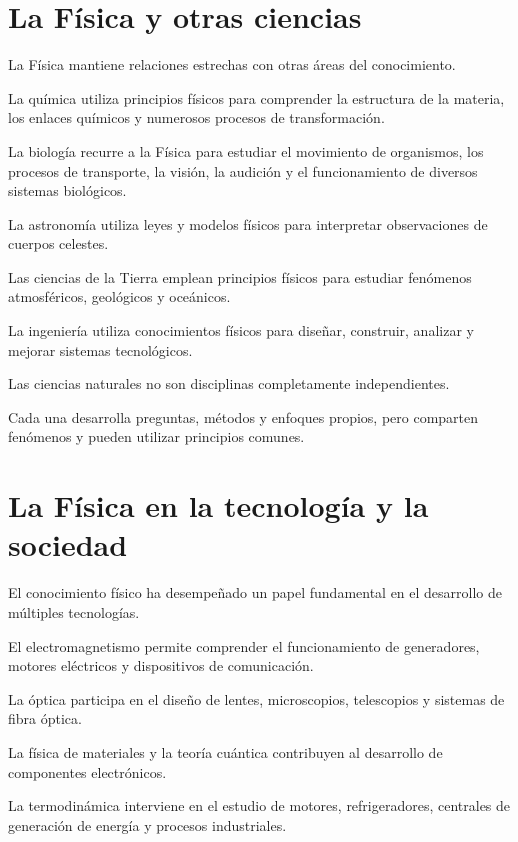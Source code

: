 \section{La Física y otras ciencias}

La Física mantiene relaciones estrechas
con otras áreas del conocimiento.

La química utiliza principios físicos
para comprender la estructura de la materia,
los enlaces químicos y numerosos
procesos de transformación.

La biología recurre a la Física
para estudiar el movimiento de organismos,
los procesos de transporte, la visión,
la audición y el funcionamiento
de diversos sistemas biológicos.

La astronomía utiliza leyes y modelos
físicos para interpretar observaciones
de cuerpos celestes.

Las ciencias de la Tierra emplean
principios físicos para estudiar
fenómenos atmosféricos, geológicos
y oceánicos.

La ingeniería utiliza conocimientos
físicos para diseñar, construir,
analizar y mejorar sistemas tecnológicos.

\begin{idea}

Las ciencias naturales no son disciplinas
completamente independientes.

Cada una desarrolla preguntas,
métodos y enfoques propios,
pero comparten fenómenos
y pueden utilizar principios comunes.

\end{idea}


\section{La Física en la tecnología y la sociedad}

El conocimiento físico ha desempeñado
un papel fundamental en el desarrollo
de múltiples tecnologías.

El electromagnetismo permite comprender
el funcionamiento de generadores,
motores eléctricos y dispositivos
de comunicación.

La óptica participa en el diseño
de lentes, microscopios, telescopios
y sistemas de fibra óptica.

La física de materiales y la teoría
cuántica contribuyen al desarrollo
de componentes electrónicos.

La termodinámica interviene en
el estudio de motores, refrigeradores,
centrales de generación de energía
y procesos industriales.

